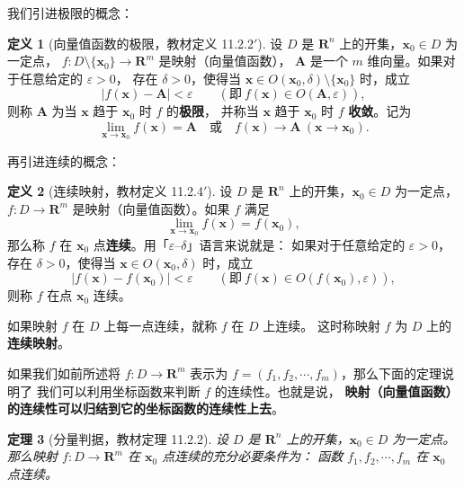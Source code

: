 \documentclass[11pt]{ctexart}
\theoremstyle{plain}
\newtheorem{thm}{定理}[section]
\theoremstyle{definition}
\newtheorem{defn}[thm]{定义}
\theoremstyle{remark}
\begin{document}
我们引进极限的概念：

\begin{defn}[向量值函数的极限，教材定义 11.2.2$'$]\label{def:vlim}
设 \(D\) 是 \(\mathbf{R}^n\) 上的开集，\(\boldsymbol{x}_0\in D\) 为一定点，
\(f\colon D\setminus\{\boldsymbol{x}_0\}\to\mathbf{R}^m\) 是映射（向量值函数），
\(\boldsymbol{A}\) 是一个 \(m\) 维向量。如果对于任意给定的 \(\varepsilon>0\)，
存在 \(\delta>0\)，使得当
\(\boldsymbol{x}\in O(\boldsymbol{x}_0,\delta)\setminus\{\boldsymbol{x}_0\}\) 时，成立
\[
  |f(\boldsymbol{x})-\boldsymbol{A}|<\varepsilon
  \qquad(\text{即}\ f(\boldsymbol{x})\in O(\boldsymbol{A},\varepsilon)),
\]
则称 \(\boldsymbol{A}\) 为当 \(\boldsymbol{x}\) 趋于 \(\boldsymbol{x}_0\) 时 \(f\) 的\textbf{极限}，
并称当 \(\boldsymbol{x}\) 趋于 \(\boldsymbol{x}_0\) 时 \(f\) \textbf{收敛}。记为
\[
  \lim_{\boldsymbol{x}\to\boldsymbol{x}_0}f(\boldsymbol{x})=\boldsymbol{A}
  \quad\text{或}\quad f(\boldsymbol{x})\to\boldsymbol{A}\ (\boldsymbol{x}\to\boldsymbol{x}_0).
\]
\end{defn}

再引进连续的概念：

\begin{defn}[连续映射，教材定义 11.2.4$'$]\label{def:contmap}
设 \(D\) 是 \(\mathbf{R}^n\) 上的开集，\(\boldsymbol{x}_0\in D\) 为一定点，
\(f\colon D\to\mathbf{R}^m\) 是映射（向量值函数）。如果 \(f\) 满足
\[
  \lim_{\boldsymbol{x}\to\boldsymbol{x}_0}f(\boldsymbol{x})=f(\boldsymbol{x}_0),
\]
那么称 \(f\) 在 \(\boldsymbol{x}_0\) 点\textbf{连续}。用「\(\varepsilon\)--\(\delta\)」语言来说就是：
如果对于任意给定的 \(\varepsilon>0\)，存在 \(\delta>0\)，使得当
\(\boldsymbol{x}\in O(\boldsymbol{x}_0,\delta)\) 时，成立
\[
  |f(\boldsymbol{x})-f(\boldsymbol{x}_0)|<\varepsilon
  \qquad(\text{即}\ f(\boldsymbol{x})\in O(f(\boldsymbol{x}_0),\varepsilon)),
\]
则称 \(f\) 在点 \(\boldsymbol{x}_0\) 连续。

如果映射 \(f\) 在 \(D\) 上每一点连续，就称 \(f\) 在 \(D\) 上连续。
这时称映射 \(f\) 为 \(D\) 上的\textbf{连续映射}。
\end{defn}

如果我们如前所述将 \(f\colon D\to\mathbf{R}^m\) 表示为
\(f=(f_1,f_2,\cdots,f_m)\)，那么下面的定理说明了
我们可以利用坐标函数来判断 \(f\) 的连续性。也就是说，
\textbf{映射（向量值函数）的连续性可以归结到它的坐标函数的连续性上去}。

\begin{thm}[分量判据，教材定理 11.2.2]\label{thm:coordcont}
设 \(D\) 是 \(\mathbf{R}^n\) 上的开集，\(\boldsymbol{x}_0\in D\) 为一定点。
那么映射 \(f\colon D\to\mathbf{R}^m\) 在 \(\boldsymbol{x}_0\) 点连续的充分必要条件为：
函数 \(f_1,f_2,\cdots,f_m\) 在 \(\boldsymbol{x}_0\) 点连续。
\end{thm}
\end{document}
